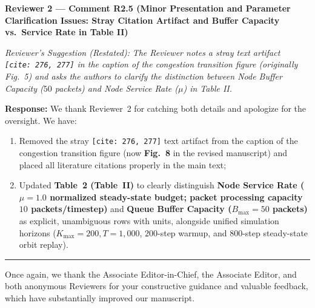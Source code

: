 \documentclass[11pt,a4paper]{article}
\newcommand{\cbox}[2]{%
  \vspace{0.6em}\noindent\textbf{#1}\par\smallskip
  \noindent\textit{Reviewer's Suggestion (Restated):} \textit{#2}\par\smallskip
}
\begin{document}
\hrulefill

\cbox{Reviewer 2 --- Comment R2.5 (Minor Presentation and Parameter Clarification Issues: Stray Citation Artifact and Buffer Capacity vs.\ Service Rate in Table II)}{The Reviewer notes a stray text artifact \texttt{[cite:\ 276, 277]} in the caption of the congestion transition figure (originally Fig.~5) and asks the authors to clarify the distinction between Node Buffer Capacity ($50$ packets) and Node Service Rate ($\mu$) in Table II.}

\noindent\textbf{Response:} We thank Reviewer~2 for catching both details and apologize for the oversight. We have:
\begin{enumerate}[leftmargin=1.8em]
    \item Removed the stray \texttt{[cite:\ 276, 277]} text artifact from the caption of the congestion transition figure (now \textbf{Fig.~8} in the revised manuscript) and placed all literature citations properly in the main text;
    \item Updated \textbf{Table~2 (Table~II)} to clearly distinguish \textbf{Node Service Rate ($\mu = 1.0$ normalized steady-state budget; packet processing capacity $10$ packets/timestep)} and \textbf{Queue Buffer Capacity ($B_{\max} = 50$ packets)} as explicit, unambiguous rows with units, alongside unified simulation horizons ($K_{\max}=200, T=1{,}000$, $200$-step warmup, and $800$-step steady-state orbit replay).
\end{enumerate}

\vspace{1em}
\hrule
\vspace{0.5em}
Once again, we thank the Associate Editor-in-Chief, the Associate Editor, and both anonymous Reviewers for your constructive guidance and valuable feedback, which have substantially improved our manuscript.
\end{document}
